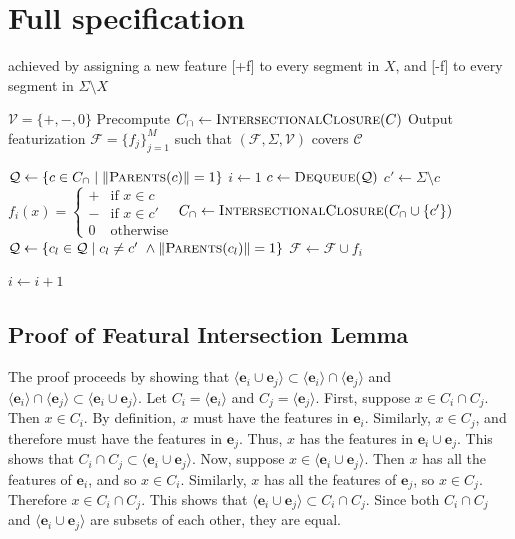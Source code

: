 \documentclass[11pt, oneside]{article}   	%
\begin{document}
\section{Full specification}


achieved by assigning a new feature [+f] to every segment in $X$, and [-f] to every segment in $\Sigma \setminus X$

\vspace{\baselineskip} \noindent \begin{algorithmic}
	\REQUIRE $\mathcal V = \{ +, -, 0 \}$
	\REQUIRE Precompute $C_\cap \leftarrow \textsc{IntersectionalClosure}(C)$
	\ENSURE Output featurization $\mathcal F = \{ f_j \}_{j=1}^M$ such that $(\mathcal F, \Sigma, \mathcal V)$ covers $\mathcal C$
	
	\STATE
	\STATE $\mathcal Q \leftarrow \{c \in C_\cap \mid \Vert\textsc{Parents}(c)\Vert = 1 \}$
	\STATE $i \leftarrow 1$
	\STATE
	\STATE $c \leftarrow \textsc{Dequeue}(\mathcal Q)$
	\STATE $c' \leftarrow \Sigma \setminus c$
	\STATE $f_i(x) = \begin{cases}
	+ & \mbox{if } x \in c \\
	- & \mbox{if } x \in c' \\
	0 & \mbox{otherwise}
	\end{cases} $
	\STATE $C_\cap \leftarrow \textsc{IntersectionalClosure}(C_\cap \cup \{c'\})$
	\STATE $\mathcal Q \leftarrow \{c_l \in \mathcal Q \mid c_l \not= c' \ \land \Vert \textsc{Parents}(c_l) \Vert = 1 \}$
	\STATE $\mathcal F \leftarrow \mathcal F \cup f_i$
	
	\STATE $i \leftarrow i + 1$
	\ENDWHILE
\end{algorithmic}

\appendix

\subsection{Proof of Featural Intersection Lemma}

The proof proceeds by showing that $\langle \mathbf{e}_i \cup \mathbf{e}_j \rangle \subset  \langle \mathbf{e}_i \rangle \cap \langle \mathbf{e}_j \rangle$ and $ \langle \mathbf{e}_i \rangle \cap \langle \mathbf{e}_j \rangle \subset \langle \mathbf{e}_i \cup \mathbf{e}_j \rangle$.
Let $C_i = \langle \mathbf{e}_i \rangle$ and $C_j = \langle \mathbf{e}_j \rangle$.
First, suppose $x \in C_i \cap C_j$. Then $x \in C_i$. By definition, $x$ must have the features in $\mathbf{e}_i$.
Similarly, $x \in C_j$, and therefore must have the features in $\mathbf{e}_j$.
Thus, $x$ has the features in $\mathbf{e}_i \cup \mathbf{e}_j$. This shows that $C_i \cap C_j \subset \langle \mathbf{e}_i \cup \mathbf{e}_j \rangle$.
Now, suppose $x \in \langle \mathbf{e}_i \cup \mathbf{e}_j \rangle$. Then $x$ has all the features of $\mathbf{e}_i$, and so $x \in C_i$.
Similarly, $x$ has all the features of $\mathbf{e}_j$, so $x \in C_j$. Therefore $x \in C_i \cap C_j$. This shows that $\langle \mathbf{e}_i \cup \mathbf{e}_j \rangle \subset C_i \cap C_j$.
Since both $C_i \cap C_j$ and $\langle \mathbf{e}_i \cup \mathbf{e}_j \rangle$ are subsets of each other, they are equal.
\end{document}
